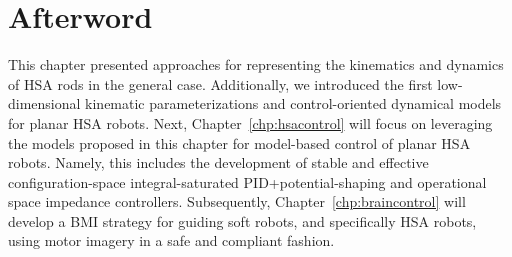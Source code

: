 \newpage








\section*{Afterword}
This chapter presented approaches for representing the kinematics and dynamics of \gls{HSA} rods in the general case. Additionally, we introduced the first low-dimensional kinematic parameterizations and control-oriented dynamical models for planar \gls{HSA} robots.
Next, Chapter~\ref{chp:hsacontrol} will focus on leveraging the models proposed in this chapter for model-based control of planar \gls{HSA} robots.
Namely, this includes the development of stable and effective configuration-space integral-saturated PID+potential-shaping and operational space impedance controllers.
Subsequently, Chapter~\ref{chp:braincontrol} will develop a \gls{BMI} strategy for guiding soft robots, and specifically \gls{HSA} robots, using motor imagery in a safe and compliant fashion.